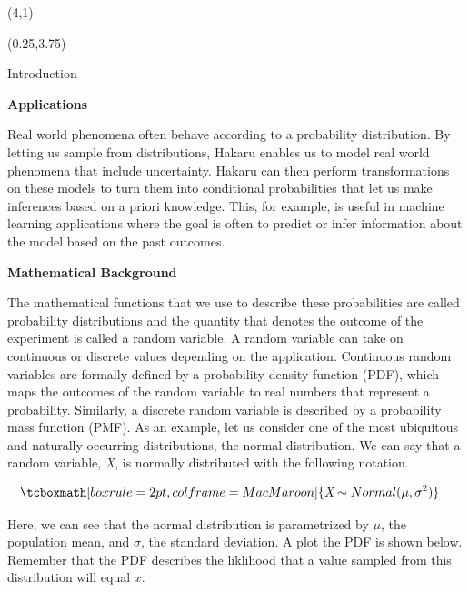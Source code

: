 \documentclass[22pt]{beamer}
\begin{document}
\begin{frame}[fragile]
\begin{textblock}{8}(4,1)
\titlepage
\end{textblock}

\begin{textblock}{5}(0.25,3.75)


\begin{block}{\Large{Introduction}}
\justifying

\normalsize{{\textbf{Applications}}}

\bigskip
\scriptsize{Real world phenomena often behave according to a probability distribution. By letting us sample from distributions, Hakaru enables us to model real world phenomena that include uncertainty. Hakaru can then perform transformations on these models to turn them into conditional probabilities that let us make inferences based on a priori knowledge. This, for example, is useful in machine learning applications where the goal is often to predict or infer information about the model based on the past outcomes.}

\bigskip
\normalsize{\textbf{Mathematical Background}}

\bigskip
\scriptsize{The mathematical functions that we use to describe these probabilities are called probability distributions and the quantity that denotes the outcome of the experiment is called a random variable. A random variable can take on continuous or discrete values depending on the application. Continuous random variables are formally defined by a probability density function (PDF), which maps the outcomes of the random variable to real numbers that represent a probability. Similarly, a discrete random variable is described by a probability mass function (PMF). As an example, let us consider one of the most ubiquitous and naturally occurring distributions, the normal distribution. We can say that a random variable, \textit{X}, is normally distributed with the following notation. }

\begin{equation*}
\begin{aligned}
& \tcboxmath[boxrule=2pt,colframe=MacMaroon]{\textit{X} \sim Normal(\mu, \sigma^2)}
\end{aligned}
\end{equation*}

\bigskip
\scriptsize{Here, we can see that the normal distribution is parametrized by $\mu$, the population mean, and $\sigma$, the standard deviation. A plot the PDF is shown below. Remember that the PDF describes the liklihood that a value sampled from this distribution will equal $x$.}


\end{block}
\end{textblock}
\end{frame}
\end{document}
